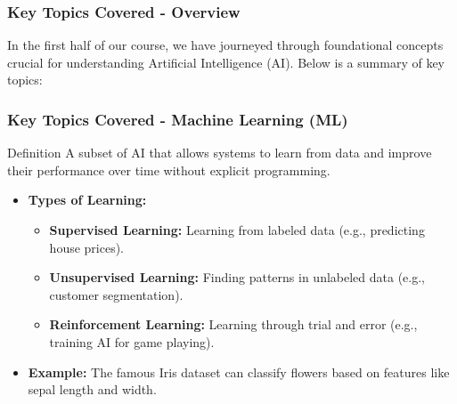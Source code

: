 \documentclass[aspectratio=169]{beamer}
\begin{document}
\begin{frame}[fragile]
    \frametitle{Key Topics Covered - Overview}
    In the first half of our course, we have journeyed through foundational concepts crucial for understanding Artificial Intelligence (AI). Below is a summary of key topics:
\end{frame}

\begin{frame}[fragile]
    \frametitle{Key Topics Covered - Machine Learning (ML)}
    \begin{block}{Definition}
        A subset of AI that allows systems to learn from data and improve their performance over time without explicit programming.
    \end{block}
    
    \begin{itemize}
        \item \textbf{Types of Learning:}
        \begin{itemize}
            \item \textbf{Supervised Learning:} Learning from labeled data (e.g., predicting house prices).
            \item \textbf{Unsupervised Learning:} Finding patterns in unlabeled data (e.g., customer segmentation).
            \item \textbf{Reinforcement Learning:} Learning through trial and error (e.g., training AI for game playing).
        \end{itemize}
        \item \textbf{Example:} The famous Iris dataset can classify flowers based on features like sepal length and width.
    \end{itemize}
\end{frame}
\end{document}
